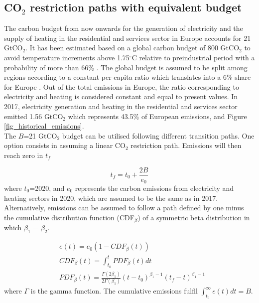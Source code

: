 \documentclass[3p]{elsarticle} %
\begin{document}
\subsection{CO$_2$ restriction paths with equivalent budget}

The carbon budget from now onwards for the generation of electricity and the supply of heating in the residential and services sector in Europe accounts for 21 GtCO$_2$. It has been estimated based on a global carbon budget of 800 GtCO$_2$ to avoid temperature increments above 1.75$^{\circ}$C relative to preindustrial period with a probability of more than 66\% \cite{IPCC_1.5}. The global budget is assumed to be split among regions according to a constant per-capita ratio which translates into a 6\% share for Europe \cite{Raupach_2014}. Out of the total emissions in Europe, the ratio corresponding to electricity and heating is considered constant and equal to present values. In 2017, electricity generation and heating in the residential and services sector emitted 1.56 GtCO$_2$ which represents 43.5\% of European emissions,  \cite{UNFCCC_inventory} and Figure \ref{fig_historical_emissions}. \\



The $B$=21 GtCO$_2$ budget can be utilised following different transition paths. One option consists in assuming a linear CO$_2$ restriction path. Emissions will then reach zero in $t_f$

\begin{equation}
	t_f=t_0+\frac{2B}{e_0}
\end{equation}
where $t_0$=2020, and $e_0$ represents the carbon emissions from electricity and heating sectors in 2020, which are assumed to be the same as in 2017. \\

Alternatively, emissions can be assumed to follow a path defined by one minus the cumulative distribution function (CDF$_\beta$) of a symmetric beta distribution in which $\beta_1$ = $\beta_2$. 

\begin{equation}
\begin{aligned}
&	e (t) = e_0(1- CDF_{\beta}(t)) \\
&	CDF_{\beta} (t) =\int_{t_0}^{t} PDF_{\beta}(t) dt \\
&	PDF_{\beta} (t) =  \frac{\Gamma(2\beta_1)}{2\Gamma(\beta_1)} (t-t_0)^{\beta_1-1} (t_f-t)^{\beta_1-1}
\end{aligned}
\end{equation}
where $\Gamma$ is the gamma function. The cumulative emissions fulfil $\int_{t_0}^{\infty} e(t) dt =B$. \\
\end{document}
